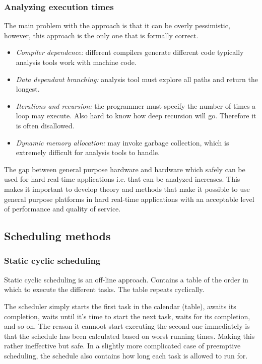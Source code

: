 \documentclass[a4paper]{article}
\begin{document}
\subsubsection{Analyzing execution times}
The main problem with the approach is that it can be overly pessimistic, however,
this approach  is the only one that is formally correct.

\begin{itemize}
  \item \emph{Compiler dependence:} different compilers generate different code
        typically analysis tools work with machine code.
  \item \emph{Data dependant branching:} analysis tool must explore all paths
        and return the longest.
  \item \emph{Iterations and recursion:} the programmer must specify the number
        of times a loop may execute. Also hard to know how deep recursion will
        go. Therefore it is often disallowed.
  \item \emph{Dynamic memory allocation:} may invoke garbage collection, which
        is extremely difficult for analysis tools to handle.
\end{itemize}

The gap between general purpose hardware and hardware which safely can be used
for hard real-time applications i.e. that can be analyzed increases. This makes
it important to develop theory and methods that make it possible to use general
purpose platforms in hard real-time applications with an acceptable level of
performance and quality of service.

\subsection{Scheduling methods}
\subsubsection{Static cyclic scheduling}
Static cyclic scheduling is an off-line approach. Contains a table of the order
in which to execute the different tasks. The table repeats cyclically.

The scheduler simply starts the first task in the calendar (table), awaits its
completion, waits until it's time to start the next task, waits for its
completion, and so on. The reason it cannoot start executing the second one
immediately is that the schedule has been calculated based on worst running
times. Making this rather ineffective but safe. In a slightly more complicated
case of preemptive scheduling, the schedule also contains how long each task is
allowed to run for.
\end{document}
